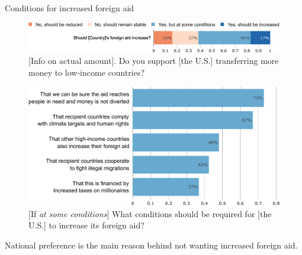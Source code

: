 \documentclass[aspectratio=169,xcolor=dvipsnames, 11pt,mathserif]{beamer}
\begin{document}
\begin{framefont}{\small}
\begin{frame}{Conditions for increased foreign aid\label{foreign_aid_conditions} \hyperlink{foreign_aid_perceptions}{}}
    \begin{figure} \vspace{-.2cm}
        \centering 
        \caption{[Info on actual amount]. Do you support [the U.S.] transferring more money to low-income countries?}\vspace{-.2cm}
        \includegraphics[width=.7\textwidth]{../figures/all/foreign_aid_raise_support.pdf} 
    \end{figure}\vspace{-.2cm} \pause
    \begin{figure} 
        \centering 
        \caption{[If \textit{at some conditions}] What conditions should be required for [the U.S.] to increase its foreign aid?}\vspace{-.2cm}
        \includegraphics[height=.48\textheight]{../figures/all/foreign_aid_condition.pdf} 
    \end{figure} \pause \vspace{-.3cm}
	\bbvs \ip {}%
	\ip National preference is the main reason behind not wanting increased foreign aid.
	\ee 
\end{frame}


\end{framefont}
\end{document}
